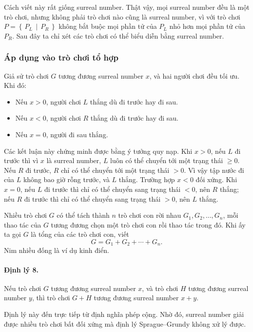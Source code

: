 \documentclass[11pt]{article}
\newcommand{\Gpos}[2]{\left\{\,#1\,\middle|\,#2\,\right\}}
\begin{document}
Cách viết này rất giống surreal number. Thật vậy, mọi surreal number đều là
một trò chơi, nhưng không phải trò chơi nào cũng là surreal number, vì với
trò chơi \(P=\Gpos{P_L}{P_R}\) không bắt buộc mọi phần tử của \(P_L\) nhỏ hơn
mọi phần tử của \(P_R\). Sau đây ta chỉ xét các trò chơi có thể biểu diễn bằng
surreal number.

\subsubsection{Áp dụng vào trò chơi tổ hợp}

Giả sử trò chơi \(G\) tương đương surreal number \(x\), và hai người chơi đều
tối ưu. Khi đó:
\begin{itemize}
  \item Nếu \(x>0\), người chơi \(L\) thắng dù đi trước hay đi sau.
  \item Nếu \(x<0\), người chơi \(R\) thắng dù đi trước hay đi sau.
  \item Nếu \(x=0\), người đi sau thắng.
\end{itemize}

Các kết luận này chứng minh được bằng ý tưởng quy nạp. Khi \(x>0\), nếu \(L\)
đi trước thì vì \(x\) là surreal number, \(L\) luôn có thể chuyển tới một
trạng thái \(\ge 0\). Nếu \(R\) đi trước, \(R\) chỉ có thể chuyển tới một
trạng thái \(>0\). Vì vậy tập nước đi của \(L\) không bao giờ rỗng trước, và
\(L\) thắng. Trường hợp \(x<0\) đối xứng. Khi \(x=0\), nếu \(L\) đi trước thì
chỉ có thể chuyển sang trạng thái \(<0\), nên \(R\) thắng; nếu \(R\) đi trước
thì chỉ có thể chuyển sang trạng thái \(>0\), nên \(L\) thắng.

Nhiều trò chơi \(G\) có thể tách thành \(n\) trò chơi con rời nhau
\(G_1,G_2,\ldots,G_n\), mỗi thao tác của \(G\) tương đương chọn một trò chơi
con rồi thao tác trong đó. Khi ấy ta gọi \(G\) là tổng của các trò chơi con,
viết
\[
  G=G_1+G_2+\cdots+G_n.
\]
Nim nhiều đống là ví dụ kinh điển.

\paragraph{Định lý 8.}
Nếu trò chơi \(G\) tương đương surreal number \(x\), và trò chơi \(H\) tương
đương surreal number \(y\), thì trò chơi \(G+H\) tương đương surreal number
\(x+y\).

Định lý này đến trực tiếp từ định nghĩa phép cộng. Nhờ đó, surreal number giải
được nhiều trò chơi bất đối xứng mà định lý Sprague--Grundy không xử lý được.
\end{document}

